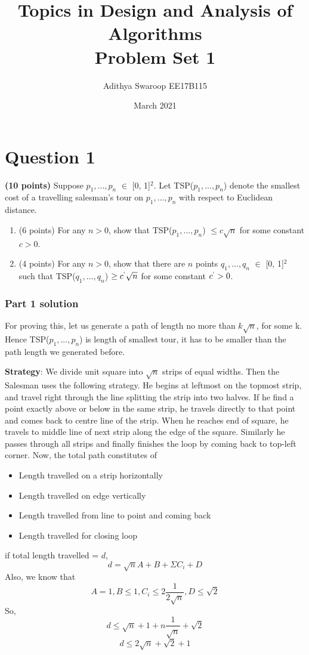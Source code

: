 \documentclass{article}
\title{Topics in Design and Analysis of Algorithms\\Problem Set 1}
\author{Adithya Swaroop EE17B115}
\date{March 2021}
\begin{document}
\maketitle

\section*{Question 1}
\textbf{(10 points)} Suppose $p_1,...,p_n$ $\in$ [0, 1]$^2$. Let TSP($p_1,...,p_n$) denote the smallest cost of a travelling salesman's tour on $p_1,...,p_n$ with respect to Euclidean distance.  
\begin{enumerate}
    \item (6 points) For any $n > 0$, show that TSP($p_1,...,p_n$) $\leq c\sqrt{n}$ for some constant $c >0$.
    \item (4 points) For any $n > 0$, show that there are $n$ points $q_1,...,q_n$ $\in$ [0, 1]$^2$ such that TSP($q_1,...,q_n$) $\geq c^`\sqrt{n}$ for some constant $c^` >0$.
\end{enumerate}

\subsubsection*{Part 1 solution}
\hspace{8mm} For proving this, let us generate a path of length no more than $k\sqrt{n}$, for some k. Hence TSP($p_1,...,p_n$) is length of smallest tour, it has to be smaller than the path length we generated before.\par
\textbf{Strategy}: We divide unit square into $\sqrt{n}$ strips of equal widths. Then the Salesman uses the following strategy. He begins at leftmost on the topmost strip, and travel right through the line splitting the strip into two halves. If he find a point exactly above or below in the same strip, he travels directly to that point and comes back to centre line of the strip. When he reaches end of square, he travels to middle line of next strip along the edge of the square. Similarly he passes through all strips and finally finishes the loop by coming back to top-left corner.
Now, the total path constitutes of
\begin{itemize}
    \item Length travelled on a strip horizontally
    \item Length travelled on edge vertically
    \item Length travelled from line to point and coming back
    \item Length travelled for closing loop
\end{itemize}
if total length travelled = $d$, 
$$d = \sqrt{n}A+ B+\Sigma C_i+D$$
Also, we know that
$$ A = 1, B \leq 1, C_i \leq 2\frac{1}{2\sqrt{n}}, D \leq \sqrt{2}$$
So, 
$$d \leq \sqrt{n}+ 1+n\frac{1}{\sqrt{n}}+\sqrt{2}$$
$$d \leq 2\sqrt{n}+\sqrt{2}+1$$
\end{document}

